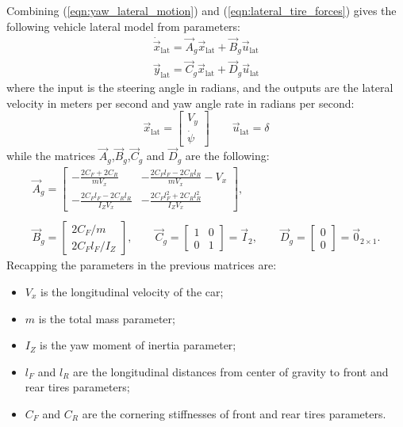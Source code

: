 Combining (\ref{eqn:yaw_lateral_motion}) and (\ref{eqn:lateral_tire_forces}) gives the following vehicle lateral model from parameters: 
\begin{equation}
\label{eqn:lateral_dynamics_simple_model}
\begin{array}{ll}
\dot{\vec{x}}_{\text{lat}} =\vec{A}_g \vec{x}_{\text{lat}}+ \vec{B}_g \vec{u}_{\text{lat}}\\
\vec{y}_{\text{lat}} =\vec{C}_g \vec{x}_{\text{lat}} + \vec{D}_g \vec{u}_{\text{lat}}
\end{array}
\end{equation}
where the input is the steering angle in radians, and the outputs are the lateral velocity in meters per second and yaw angle rate in radians per second:
\begin{equation}
\vec{x}_{\text{lat}} = \begin{bmatrix}
V_y\\\dot{\psi}
\end{bmatrix}
\qquad
\vec{u}_{\text{lat}} = \delta
\end{equation}
while the matrices $\vec{A}_g$,$\vec{B}_g$,$\vec{C}_g$ and $\vec{D}_g$ are the following:
\begin{equation}
\begin{array}{cc}
\vec{A}_g=
\begin{bmatrix}
\displaystyle -\frac{2C_F+2C_R}{mV_x}&\displaystyle -\frac{2C_Fl_F-2C_Rl_R}{mV_x} - V_x\\
\displaystyle -\frac{2C_Fl_F-2C_Rl_R}{I_ZV_x}&\displaystyle -\frac{2C_Fl_F^2+2C_Rl_R^2}{I_ZV_x}
\end{bmatrix},
\\\\
\vec{B}_g=\begin{bmatrix}
2C_F/m\\2C_Fl_F/I_Z
\end{bmatrix},
\qquad
\vec{C}_g=\begin{bmatrix}
1&0\\0&1
\end{bmatrix}=
\vec{I}_2, 
\qquad
\vec{D}_g=\begin{bmatrix}
0\\0
\end{bmatrix}=
\vec{0}_{2\times1}.
\end{array}
\end{equation}
Recapping the parameters in the previous matrices are:
\begin{itemize}
	\item $V_x$ is the longitudinal velocity of the car;	
	\item $m$ is the total mass parameter; 
	\item $I_Z$ is the yaw moment of inertia parameter;
	\item $l_F$ and $l_R$ are the longitudinal distances from center of gravity to front and rear tires parameters;
	\item $C_F$ and $C_R$ are the cornering stiffnesses of front and rear tires parameters.
\end{itemize}
